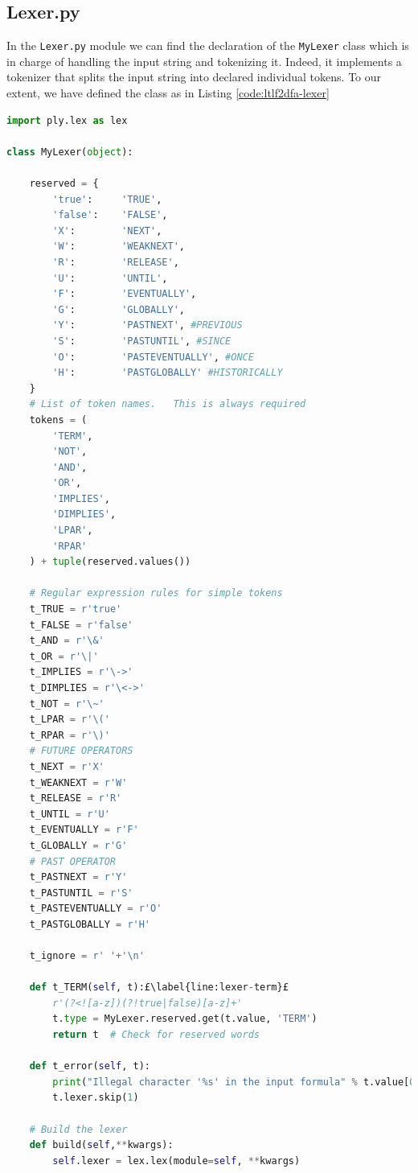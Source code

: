 \subsection{Lexer.py}
In the \texttt{Lexer.py} module we can find the declaration of the \texttt{MyLexer} class which is in charge of handling the input string and tokenizing it. Indeed, it implements a tokenizer that splits the input string into declared individual tokens.
To our extent, we have defined the class as in Listing \ref{code:ltlf2dfa-lexer}
\begin{lstlisting}[language=Python, style=Python, escapechar = £, label={code:ltlf2dfa-lexer}, caption={\texttt{Lexer.py} module}]
import ply.lex as lex

class MyLexer(object):

    reserved = {
        'true':     'TRUE',
        'false':    'FALSE',
        'X':        'NEXT',
        'W':        'WEAKNEXT',
        'R':        'RELEASE',        
        'U':        'UNTIL',
        'F':        'EVENTUALLY',
        'G':        'GLOBALLY',
        'Y':        'PASTNEXT', #PREVIOUS
        'S':        'PASTUNTIL', #SINCE
        'O':        'PASTEVENTUALLY', #ONCE
        'H':        'PASTGLOBALLY' #HISTORICALLY
    }
    # List of token names.   This is always required
    tokens = (
        'TERM',
        'NOT',
        'AND',
        'OR',
        'IMPLIES',
        'DIMPLIES',
        'LPAR',
        'RPAR'
    ) + tuple(reserved.values())

    # Regular expression rules for simple tokens
    t_TRUE = r'true'
    t_FALSE = r'false'
    t_AND = r'\&'
    t_OR = r'\|'
    t_IMPLIES = r'\->'
    t_DIMPLIES = r'\<->'
    t_NOT = r'\~'
    t_LPAR = r'\('
    t_RPAR = r'\)'
    # FUTURE OPERATORS
    t_NEXT = r'X'
    t_WEAKNEXT = r'W'
    t_RELEASE = r'R'    
    t_UNTIL = r'U'
    t_EVENTUALLY = r'F'
    t_GLOBALLY = r'G'
    # PAST OPERATOR
    t_PASTNEXT = r'Y'
    t_PASTUNTIL = r'S'
    t_PASTEVENTUALLY = r'O'
    t_PASTGLOBALLY = r'H'

    t_ignore = r' '+'\n'

    def t_TERM(self, t):£\label{line:lexer-term}£
        r'(?<![a-z])(?!true|false)[a-z]+'
        t.type = MyLexer.reserved.get(t.value, 'TERM')
        return t  # Check for reserved words

    def t_error(self, t):
        print("Illegal character '%s' in the input formula" % t.value[0])
        t.lexer.skip(1)

    # Build the lexer
    def build(self,**kwargs):
        self.lexer = lex.lex(module=self, **kwargs)
\end{lstlisting}
